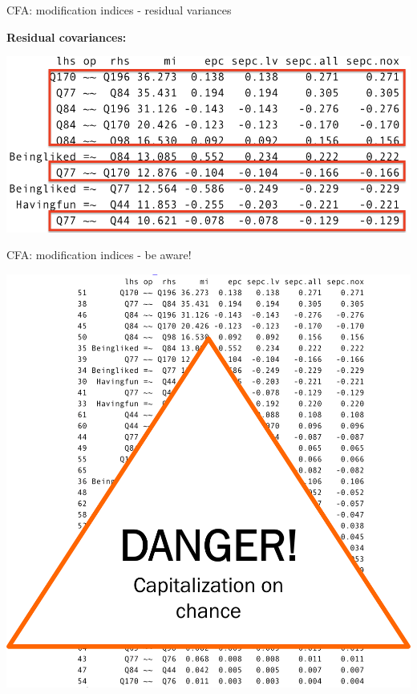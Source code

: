 \documentclass[10pt]{beamer}\usepackage[]{graphicx}\usepackage[]{xcolor}
\begin{document}
%
\begin{frame}{CFA: modification indices - residual variances}

\textbf{Residual covariances:} \vspace{5mm}

\includegraphics[width=\linewidth,height=0.5\textwidth,keepaspectratio]{images/slide48.png} 

\end{frame}
%
\begin{frame}{CFA: modification indices - be aware!}

\centering
\includegraphics[width=\linewidth,height=0.5\textwidth,keepaspectratio]{images/CapOnChanceMI.png}      

\end{frame}
%
\end{document}
